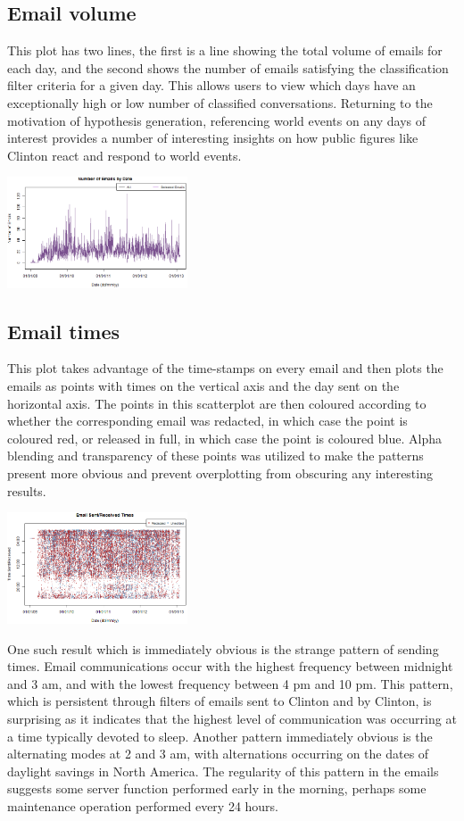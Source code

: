\documentclass[journal]{vgtc}                %
\begin{document}
\subsection{Email volume}
This plot has two lines, the first is a line showing the total volume of emails for each day, and the second shows the number of emails satisfying the classification filter criteria for a given day. This allows users to view which days have an exceptionally high or low number of classified conversations. Returning to the motivation of hypothesis generation, referencing world events on any days of interest provides a number of interesting insights on how public figures like Clinton react and respond to world events.

\includegraphics[width=0.4\textwidth]{VolumeFullTime}

\subsection{Email times}
This plot takes advantage of the time-stamps on every email and then plots the emails as points with times on the vertical axis and the day sent on the horizontal axis. The points in this scatterplot are then coloured according to whether the corresponding email was redacted, in which case the point is coloured red, or released in full, in which case the point is coloured blue. Alpha blending and transparency of these points was utilized to make the patterns present more obvious and prevent overplotting from obscuring any interesting results. 

\includegraphics[width=0.4\textwidth]{DailyFullTime}

One such result which is immediately obvious is the strange pattern of sending times. Email communications occur with the highest frequency between midnight and 3 am, and with the lowest frequency between 4 pm and 10 pm. This pattern, which is persistent through filters of emails sent to Clinton and by Clinton, is surprising as it indicates that the highest level of communication was occurring at a time typically devoted to sleep. Another pattern immediately obvious is the alternating modes at 2 and 3 am, with alternations occurring on the dates of daylight savings in North America. The regularity of this pattern in the emails suggests some server function performed early in the morning, perhaps some maintenance operation performed every 24 hours.
\end{document}
